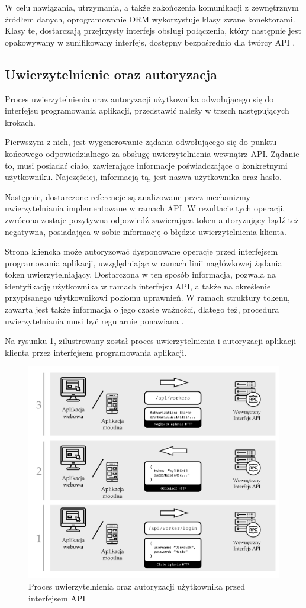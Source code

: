W celu nawiązania, utrzymania, a także zakończenia komunikacji z zewnętrznym źródłem danych, oprogramowanie ORM wykorzystuje klasy zwane konektorami. Klasy te, dostarczają przejrzysty interfejs obsługi połączenia, który następnie jest opakowywany w zunifikowany interfejs, dostępny bezpośrednio dla twórcy API \cite{TORRES20171}.

\subsection*{Uwierzytelnienie oraz autoryzacja}
Proces uwierzytelnienia oraz autoryzacji użytkownika odwołującego się do interfejsu programowania aplikacji, przedstawić należy w trzech następujących krokach.

Pierwszym z nich, jest wygenerowanie żądania odwołującego się do punktu końcowego odpowiedzialnego za obsługę uwierzytelnienia wewnątrz API. Żądanie to, musi posiadać ciało, zawierające informacje poświadczające o konkretnymi użytkowniku. Najczęściej, informacją tą, jest nazwa użytkownika oraz hasło.

Następnie, dostarczone referencje są analizowane przez mechanizmy uwierzytelniania implementowane w ramach API. W rezultacie tych operacji, zwrócona zostaje pozytywna odpowiedź zawierająca token autoryzujący bądź też negatywna, posiadająca w sobie informację o błędzie uwierzytelnienia klienta.

Strona kliencka może autoryzować dysponowane operacje przed interfejsem programowania aplikacji, uwzględniając w ramach linii nagłówkowej żądania token uwierzytelniający. Dostarczona w ten sposób informacja, pozwala na identyfikację użytkownika w ramach interfejsu API, a także na określenie przypisanego użytkownikowi poziomu uprawnień. W ramach struktury tokenu, zawarta jest także informacja o jego czasie ważności, dlatego też, procedura uwierzytelniania musi być regularnie ponawiana \cite{lakshmiraghavan2013pro}.

Na rysunku \ref{fig:uwierzytelnienie-autoryzacja}, zilustrowany został proces uwierzytelnienia i autoryzacji aplikacji klienta przez interfejsem programowania aplikacji. 

\begin{figure}[ht]
 \centering
  \includegraphics[width=0.6\linewidth]{rys02/uwierzytelnianie-autoryzacja}
 \caption{Proces uwierzytelnienia oraz autoryzacji użytkownika przed interfejsem API}
 \label{fig:uwierzytelnienie-autoryzacja}
\end{figure}


